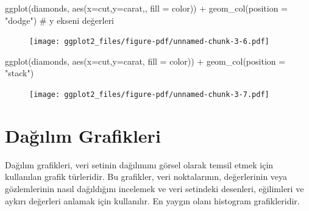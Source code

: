 \documentclass[
  letterpaper,
  DIV=11,
  numbers=noendperiod]{scrreprt}
\newenvironment{Shaded}{\begin{snugshade}}{\end{snugshade}}
\newcommand{\AttributeTok}[1]{\textcolor[rgb]{0.40,0.45,0.13}{#1}}
\newcommand{\CommentTok}[1]{\textcolor[rgb]{0.37,0.37,0.37}{#1}}
\newcommand{\FunctionTok}[1]{\textcolor[rgb]{0.28,0.35,0.67}{#1}}
\newcommand{\NormalTok}[1]{\textcolor[rgb]{0.00,0.23,0.31}{#1}}
\newcommand{\SpecialCharTok}[1]{\textcolor[rgb]{0.37,0.37,0.37}{#1}}
\newcommand{\StringTok}[1]{\textcolor[rgb]{0.13,0.47,0.30}{#1}}
\begin{document}
\begin{Shaded}
\begin{Highlighting}[]
\FunctionTok{ggplot}\NormalTok{(diamonds, }\FunctionTok{aes}\NormalTok{(}\AttributeTok{x=}\NormalTok{cut,}\AttributeTok{y=}\NormalTok{carat,, }\AttributeTok{fill =}\NormalTok{ color)) }\SpecialCharTok{+}
  \FunctionTok{geom\_col}\NormalTok{(}\AttributeTok{position =} \StringTok{"dodge"}\NormalTok{) }\CommentTok{\# y ekseni değerleri}
\end{Highlighting}
\end{Shaded}

\begin{figure}[H]

{\centering \texttt{[image: ggplot2\_files/figure-pdf/unnamed-chunk-3-6.pdf]}

}

\end{figure}

\begin{Shaded}
\begin{Highlighting}[]
\FunctionTok{ggplot}\NormalTok{(diamonds, }\FunctionTok{aes}\NormalTok{(}\AttributeTok{x=}\NormalTok{cut,}\AttributeTok{y=}\NormalTok{carat, }\AttributeTok{fill =}\NormalTok{ color)) }\SpecialCharTok{+}
  \FunctionTok{geom\_col}\NormalTok{(}\AttributeTok{position =} \StringTok{"stack"}\NormalTok{)}
\end{Highlighting}
\end{Shaded}

\begin{figure}[H]

{\centering \texttt{[image: ggplot2\_files/figure-pdf/unnamed-chunk-3-7.pdf]}

}

\end{figure}

\hypertarget{daux11fux131lux131m-grafikleri}{%
\section*{Dağılım Grafikleri}\label{daux11fux131lux131m-grafikleri}}


Dağılım grafikleri, veri setinin dağılımını görsel olarak temsil etmek
için kullanılan grafik türleridir. Bu grafikler, veri noktalarının,
değerlerinin veya gözlemlerinin nasıl dağıldığını incelemek ve veri
setindeki desenleri, eğilimleri ve aykırı değerleri anlamak için
kullanılır. En yaygın olanı histogram grafikleridir.
\end{document}
